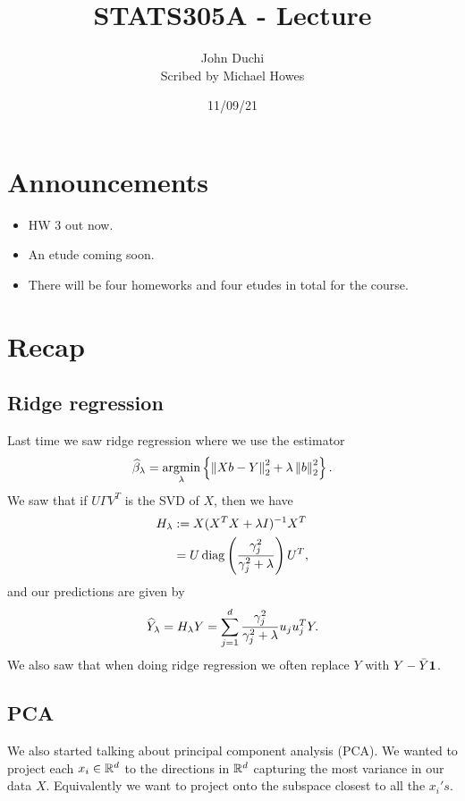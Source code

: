 


\newcommand{\pc}{{\text{pcr}(k)}}
\newcommand{\rhat}{\wh{\text{Risk}}}

\title{STATS305A - Lecture }
\author{John Duchi\\ Scribed by Michael Howes}
\date{11/09/21}

\pagestyle{fancy}
\fancyhf{}


\maketitle
\tableofcontents
\section{Announcements}
\begin{itemize}
    \item HW 3 out now.
    \item An etude coming soon.
    \item There will be four homeworks and four etudes in total for the course.
\end{itemize}
\section{Recap}
\subsection{Ridge regression}
Last time we saw ridge regression where we use the estimator
\[\widehat{\beta}_\lambda = \operatorname*{argmin}_\lambda \left\{\left\|Xb-Y\right\|_2^2+\lambda\left\|b\right\|_2^2\right\}. \]
We saw that if $U\Gamma V^T$ is the SVD of $X$, then we have 
\begin{align*}
    H_\lambda &:= X(X^TX+\lambda I)^{-1}X^T\\
    &= U\operatorname*{diag}\left(\frac{\gamma_j^2}{\gamma_j^2+\lambda}\right)U^T,
\end{align*}
and our predictions are given by
\[\widehat{Y}_\lambda = H_\lambda Y = \sum_{j=1}^d \frac{\gamma_j^2}{\gamma_j^2+\lambda}u_ju_j^TY. \]
We also saw that when doing ridge regression we often replace $Y$ with $Y-\bar{Y}{{\bf 1}}$.
\subsection{PCA}
We also started talking about principal component analysis (PCA). We wanted to project each $x_i \in {\mathbb R}^d$ to the directions in ${\mathbb R}^d$ capturing the most variance in our data $X$. Equivalently we want to project onto the subspace closest to all the $x_i's$. 
